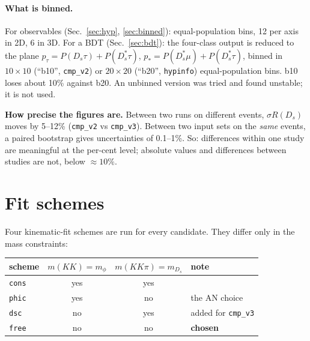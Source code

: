 \documentclass[10pt,a4paper]{article}
\newcommand{\code}[1]{\texttt{#1}}
\newcommand{\Ds}{D_s}
\newcommand{\Dss}{D_s^*}
\newcommand{\sR}{\sigma R}
\newcommand{\finding}[1]{\par\smallskip\noindent\colorbox{blue!6}{\parbox{\dimexpr\linewidth-2\fboxsep}{#1}}\par\smallskip}
\begin{document}
\paragraph{What is binned.} For observables (Sec.~\ref{sec:hyp}, \ref{sec:binned}): equal-population bins, 12 per axis
in 2D, 6 in 3D. For a BDT (Sec.~\ref{sec:bdt}): the four-class output is reduced to the plane
$p_\tau = P(\Ds\tau)+P(\Dss\tau)$, $p_{*} = P(\Dss\mu)+P(\Dss\tau)$, binned in $10\times10$ (``b10'', \code{cmp\_v2}) or
$20\times20$ (``b20'', \code{hypinfo}) equal-population bins. b10 loses about 10\% against b20. An unbinned version was
tried and found unstable; it is not used.

\finding{\textbf{How precise the figures are.} Between two runs on different events, $\sR(\Ds)$ moves by 5--12\%
(\code{cmp\_v2} vs \code{cmp\_v3}). Between two input sets on the \emph{same} events, a paired bootstrap gives
uncertainties of 0.1--1\%. So: differences within one study are meaningful at the per-cent level; absolute values and
differences between studies are not, below $\approx10\%$.}

\section{Fit schemes}
\label{sec:schemes}

Four kinematic-fit schemes are run for every candidate. They differ only in the mass constraints:

\begin{center}
\small
\begin{tabular}{lccl}
\toprule
scheme & $m(KK)=m_\phi$ & $m(KK\pi)=m_{\Ds}$ & note \\
\midrule
\code{cons} & yes & yes & \\
\code{phic} & yes & no & the AN choice \\
\code{dsc}  & no  & yes & added for \code{cmp\_v3} \\
\code{free} & no  & no  & \textbf{chosen} \\
\bottomrule
\end{tabular}
\end{center}
\end{document}
